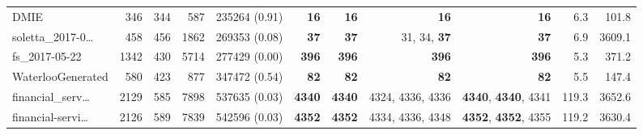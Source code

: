 \begin{table*}
\begin{tiny}
{\begin{tabular}{lrrrrrrrrrr}
DMIE & \num[text-series-to-math=true]{346} & \num[text-series-to-math=true]{344} & \num[text-series-to-math=true]{587} & \num[text-series-to-math=true]{235264} (\num[text-series-to-math=true]{0.91}) & \textbf{\num[text-series-to-math=true]{16}} & \textbf{\num[text-series-to-math=true]{16}} & \textbf{\num[text-series-to-math=true]{16}} & \textbf{\num[text-series-to-math=true]{16}} & 6.3 & 101.8\\
soletta\_2017-0\ldots & \num[text-series-to-math=true]{458} & \num[text-series-to-math=true]{456} & \num[text-series-to-math=true]{1862} & \num[text-series-to-math=true]{269353} (\num[text-series-to-math=true]{0.08}) & \textbf{\num[text-series-to-math=true]{37}} & \textbf{\num[text-series-to-math=true]{37}} & \num[text-series-to-math=true]{31}, \num[text-series-to-math=true]{34}, \textbf{\num[text-series-to-math=true]{37}} & \textbf{\num[text-series-to-math=true]{37}} & 6.9 & 3609.1\\
fs\_2017-05-22 & \num[text-series-to-math=true]{1342} & \num[text-series-to-math=true]{430} & \num[text-series-to-math=true]{5714} & \num[text-series-to-math=true]{277429} (\num[text-series-to-math=true]{0.00}) & \textbf{\num[text-series-to-math=true]{396}} & \textbf{\num[text-series-to-math=true]{396}} & \textbf{\num[text-series-to-math=true]{396}} & \textbf{\num[text-series-to-math=true]{396}} & 5.3 & 371.2\\
WaterlooGenerated & \num[text-series-to-math=true]{580} & \num[text-series-to-math=true]{423} & \num[text-series-to-math=true]{877} & \num[text-series-to-math=true]{347472} (\num[text-series-to-math=true]{0.54}) & \textbf{\num[text-series-to-math=true]{82}} & \textbf{\num[text-series-to-math=true]{82}} & \textbf{\num[text-series-to-math=true]{82}} & \textbf{\num[text-series-to-math=true]{82}} & 5.5 & 147.4\\
financial\_serv\ldots & \num[text-series-to-math=true]{2129} & \num[text-series-to-math=true]{585} & \num[text-series-to-math=true]{7898} & \num[text-series-to-math=true]{537635} (\num[text-series-to-math=true]{0.03}) & \textbf{\num[text-series-to-math=true]{4340}} & \textbf{\num[text-series-to-math=true]{4340}} & \num[text-series-to-math=true]{4324}, \num[text-series-to-math=true]{4336}, \num[text-series-to-math=true]{4336} & \textbf{\num[text-series-to-math=true]{4340}}, \textbf{\num[text-series-to-math=true]{4340}}, \num[text-series-to-math=true]{4341} & 119.3 & 3652.6\\
financial-servi\ldots & \num[text-series-to-math=true]{2126} & \num[text-series-to-math=true]{589} & \num[text-series-to-math=true]{7839} & \num[text-series-to-math=true]{542596} (\num[text-series-to-math=true]{0.03}) & \textbf{\num[text-series-to-math=true]{4352}} & \textbf{\num[text-series-to-math=true]{4352}} & \num[text-series-to-math=true]{4334}, \num[text-series-to-math=true]{4336}, \num[text-series-to-math=true]{4348} & \textbf{\num[text-series-to-math=true]{4352}}, \textbf{\num[text-series-to-math=true]{4352}}, \num[text-series-to-math=true]{4355} & 119.2 & 3630.4\\

\end{tabular}}
\end{tiny}
\end{table*}
